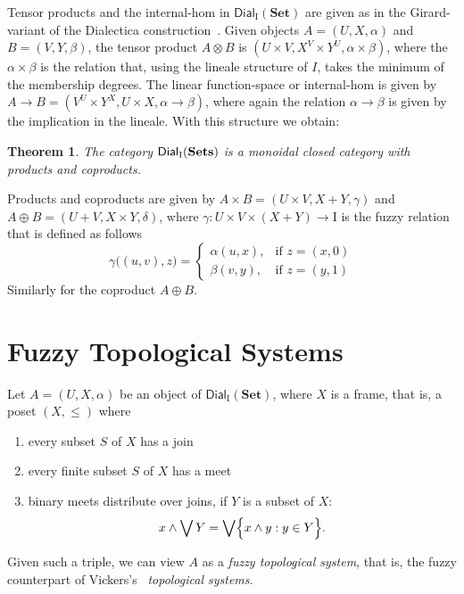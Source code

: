 \documentclass[11pt]{article}
\newtheorem{theorem}{Theorem}[section]
\begin{document}
Tensor products  and the internal-hom in $\mathsf{Dial}_{\mathrm{I}}(\mathbf{Set})$ are given as  in the Girard-variant of the  Dialectica construction~\cite{paiva89}.
Given objects $A = (U, X, \alpha)$ and  $B = (V, Y, \beta)$, the tensor product  $A\otimes B$ is
$(U\times V, X^V\times Y^U, \alpha\times\beta)$, where the $\alpha\times\beta$ is the relation that, using the lineale structure of $I$, takes the minimum of the membership degrees. The linear function-space or internal-hom is 
given by $A\to B= (V^U\times Y^X, U\times X, \alpha\to \beta)$, where again the relation $\alpha\to \beta$ is given by the implication in the lineale. With this structure we obtain:
\begin{theorem}
The category ${\sf Dial}_{{\mathrm{I}}}({\bf Sets})$ is a  monoidal closed category with products and coproducts.
\end{theorem}
Products and coproducts are given by $A\times B= (U\times V, X+ Y, \gamma)$ and 
$A\oplus B= (U+ V, X\times Y, \delta)$, where 
$\gamma:U\times V\times (X+Y)\to \mathrm{I}$ is the 
fuzzy relation that is defined as follows
\begin{displaymath}
\gamma\bigl((u,v),z\bigr) = \left\{\begin{array}{ll}
                              \alpha(u,x),& \text{if $z=(x,0)$}\\
                              \beta(v,y), & \text{if $z=(y,1)$}
                             \end{array}\right.
\end{displaymath}
Similarly for the coproduct $A\oplus B$.

\section{Fuzzy Topological Systems}
Let $A = (U, X, \alpha)$ be an object of $\mathsf{Dial}_{\mathrm{I}}(\mathbf{Set})$, 
where $X$ is a frame, that is, a poset $(X, \leq)$ where
\begin{enumerate}
\item every subset $S$ of $X$ has a join
\item every finite subset $S$ of $X$ has a meet
\item binary meets distribute over joins, if $Y$ is a subset of $X$:
\begin{displaymath}
x\wedge\bigvee Y= \bigvee\Bigl\{ x\wedge y: y\in Y\Bigr\}.
\end{displaymath}
\end{enumerate}
Given such a triple, we can view $A$ as a {\em fuzzy topological system}, that is, the fuzzy 
counterpart of Vickers's~\cite{vickers90} {\em topological systems}.
\end{document}
